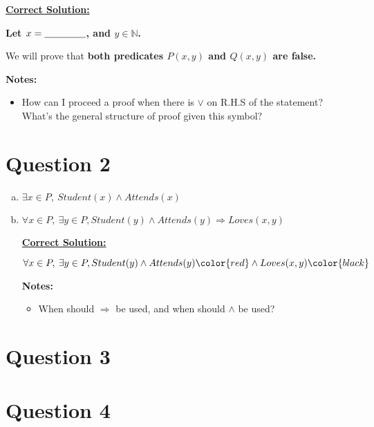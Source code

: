 \documentclass[12pt]{article}
\begin{document}
\begin{enumerate}[a.]
    \begin{mdframed}
        \underline{\textbf{Correct Solution:}}

        \color{red}
        \textbf{Let $x = \underline{\hspace{1.5cm}}$, and $y \in \mathbb{N}$.}

        \bigskip

        We will prove that \color{red}\textbf{both predicates $P(x,y)$ and $Q(x,y)$
        are false.}\color{black}

        \color{black}

    \end{mdframed}


    \textbf{Notes:}
    \begin{itemize}
        \item How can I proceed a proof when there is $\lor$ on R.H.S of the statement?
        What's the general structure of proof given this symbol?
    \end{itemize}
\end{enumerate}

\section*{Question 2}
\begin{enumerate}[a.]
    \item $\exists x \in P,\:Student(x) \land Attends(x)$
    \item

    $\forall x \in P,\:\exists y \in P, Student(y) \land Attends(y) \Rightarrow Loves(x,y)$

    \begin{mdframed}
        \underline{\textbf{Correct Solution:}}

        \bigskip

        $\forall x \in P,\:\exists y \in P, Student(y) \land Attends(y) \color{red}\land Loves(x,y)\color{black}$
    \end{mdframed}

    \textbf{Notes:}
    \begin{itemize}
        \item When should $\Rightarrow$ be used, and when should $\land$ be used?
    \end{itemize}
\end{enumerate}

\section*{Question 3}

\section*{Question 4}
\end{document}
